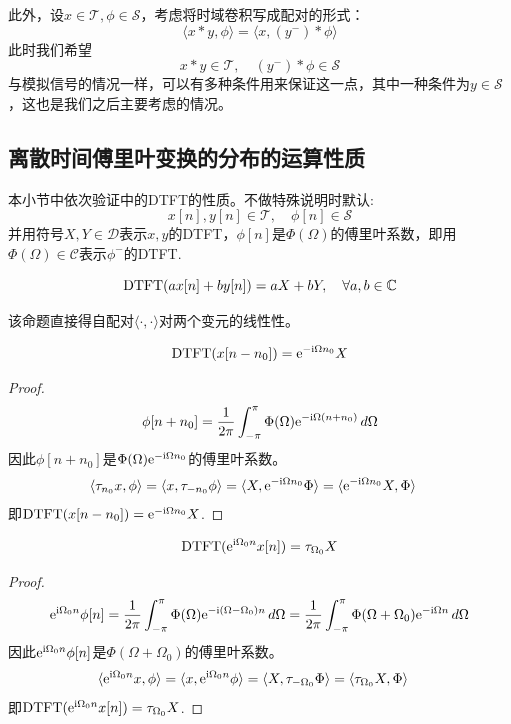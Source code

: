 此外，设$x\in\mathcal{T},\phi\in\mathcal{S}$，考虑将时域卷积写成配对的形式：
$$\langle x*y,\phi\rangle=\langle x,(y^-)*\phi\rangle$$
此时我们希望$$x*y\in\mathcal{T},\quad (y^-)*\phi\in\mathcal{S}$$
与模拟信号的情况一样，可以有多种条件用来保证这一点，其中一种条件为$y\in\mathcal{S}$，这也是我们之后主要考虑的情况。

\subsection{离散时间傅里叶变换的分布的运算性质}\label{sub:DTFT_distribution_operation}

本小节中依次验证中的DTFT的性质。不做特殊说明时默认:
$$x[n],y[n]\in\mathcal{T},\quad \phi[n]\in\mathcal{S}$$
并用符号$X,Y\in\mathcal{D}$表示$x,y$的DTFT，$\phi[n]$是$\Phi(\Omega)$的傅里叶系数，即用$\Phi(\Omega)\in\mathcal{C}$表示$\phi^-$的DTFT.

\begin{proposition}[线性性]
    $$\operatorname{DTFT}(ax[n]+by[n])=aX+bY,\quad\forall a,b\in\mathbb{C}$$
\end{proposition}
该命题直接得自配对$\langle\cdot,\cdot\rangle$对两个变元的线性性。

\begin{proposition}[时移性质]
    $$\operatorname{DTFT}(x[n-n_0])=\mathrm{e}^{-\mathrm{i} \Omega n_0}X$$
\end{proposition}
\begin{proof}
    $$\phi[n+n_0]=\frac{1}{2\pi}\int_{-\pi}^\pi \Phi(\Omega)\mathrm{e}^{-\mathrm{i}\Omega (n+n_0)}\,d\Omega$$
    因此$\phi[n+n_0]$是$\Phi(\Omega)\mathrm{e}^{-\mathrm{i}\Omega n_0}$的傅里叶系数。
    \begin{align*}
        \langle \tau_{n_0}x,\phi\rangle & =\langle x,\tau_{-n_0}\phi\rangle=\langle X,\mathrm{e}^{-\mathrm{i}\Omega n_0}\Phi\rangle=\langle\mathrm{e}^{-\mathrm{i} \Omega n_0}X,\Phi\rangle
    \end{align*}
    即$\operatorname{DTFT}(x[n-n_0])=\mathrm{e}^{-\mathrm{i} \Omega n_0}X$.
\end{proof}

\begin{proposition}[频移性质]
    $$\operatorname{DTFT}(\mathrm{e}^{\mathrm{i}\Omega_0 n}x[n])=\tau_{\Omega_0}X$$
\end{proposition}
\begin{proof}
    $$\mathrm{e}^{\mathrm{i}\Omega_0 n}\phi[n]=\frac{1}{2\pi}\int_{-\pi}^\pi \Phi(\Omega)\mathrm{e}^{-\mathrm{i}(\Omega-\Omega_0) n}\,d\Omega=\frac{1}{2\pi}\int_{-\pi}^\pi \Phi(\Omega+\Omega_0)\mathrm{e}^{-\mathrm{i}\Omega n}\,d\Omega$$
    因此$\mathrm{e}^{\mathrm{i}\Omega_0 n}\phi[n]$是$\Phi(\Omega+\Omega_0)$的傅里叶系数。
    \begin{align*}
        \langle \mathrm{e}^{\mathrm{i}\Omega_0 n}x,\phi\rangle & =\langle x,\mathrm{e}^{\mathrm{i}\Omega_0 n}\phi\rangle=\langle X,\tau_{-\Omega_0}\Phi\rangle=\langle \tau_{\Omega_0}X,\Phi\rangle
    \end{align*}
    即$\operatorname{DTFT}(\mathrm{e}^{\mathrm{i}\Omega_0 n}x[n])=\tau_{\Omega_0}X$.
\end{proof}

